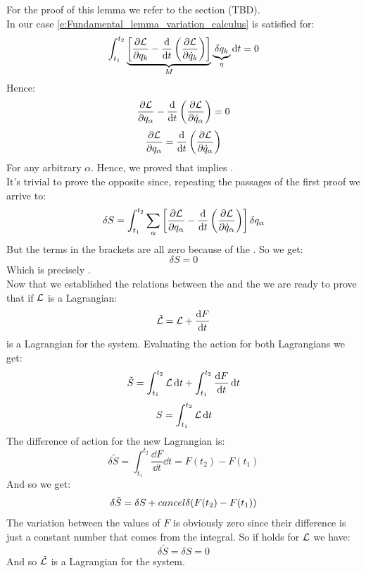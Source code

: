 For the proof of this lemma we refer to the section (TBD).\\
In our case \eqref{e:Fundamental_lemma_variation_calculus} is satisfied for:
\begin{equation}
    \int_{t_1}^{t_2}\underbrace{\left[\dfrac{\partial \lagr}{\partial q_{k}} - \dv{}{t}\brackets{\dfrac{\partial \lagr}{\partial \dot{q}_{k}}}\right]}_{M} \underbrace{\delta q_{k}}_{\eta} \dd{t} = 0
\end{equation}
Hence:
\begin{equation}
    \pdv{\lagr}{q_{\alpha}} - \dv{}{t}\brackets{\pdv{\lagr}{\dot{q}_{\alpha}}} = 0
\end{equation}
\begin{equation}
    \pdv{\lagr}{q_{\alpha}} = \dv{}{t}\brackets{\pdv{\lagr}{\dot{q}_{\alpha}}}
\end{equation}
For any arbitrary $\alpha$. Hence, we proved that \hpquotemath\;implies \eleref.\\
It's trivial to prove the opposite since, repeating the passages of the first proof we arrive to:
\begin{equation}
    \delta S = \int_{t_1}^{t_2}\bigsum_{\alpha}\left[\pdv{\lagr}{q_{\alpha}} - \dv{}{t}\brackets{\pdv{\lagr}{\dot{q}_{\alpha}}}\right] \delta q_{\alpha}
\end{equation}
But the terms in the brackets are all zero because of the \eleref. So we get:
\begin{equation}
    \delta S = 0
\end{equation}
Which is precisely \hpquotemath.\\
Now that we established the relations between the \eleref\;and the \hpquotemath\;we are ready to prove that if $\mathcal{L}$ is a Lagrangian:
\begin{equation}
    \tilde{\mathcal{L}} = \mathcal{L} + \dfrac{\dd{F}}{\dd{t}}
\end{equation}
is a Lagrangian for the system. Evaluating the action for both Lagrangians we get:
\begin{equation}
    \tilde{S} = \int_{t_1}^{t_2}\mathcal{L} \dd{t} + \int_{t_1}^{t_2}\dfrac{\dd{F}}{\dd{t}} \dd{t}
\end{equation}
\begin{equation}
    S = \int_{t_1}^{t_2}\mathcal{L} \dd{t}
\end{equation}
The difference of action for the new Lagrangian is:
\begin{equation}
    \delta \tilde{S} = \int_{t_1}^{t_2}\dfrac{\dd{F}}{\dd{t}} \dd{t} = F(t_2) - F(t_1)
\end{equation}
And so we get:
\begin{equation}
    \delta \tilde{S} = \delta S + \\cancel{\delta(F(t_2) - F(t_1))}
\end{equation}
The variation between the values of $F$ is obviously zero since their difference is just a constant number that comes from the integral. So if \hpquotemath\;holds for $\mathcal{L}$ we have:
\begin{equation}
    \delta \tilde{S} = \delta S = 0
\end{equation}
And so $\tilde{\mathcal{L}}$ is a Lagrangian for the system.\\
